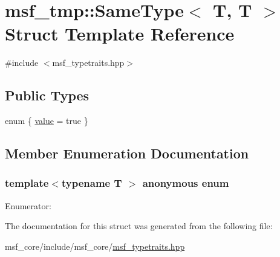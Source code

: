 \hypertarget{structmsf__tmp_1_1SameType_3_01T_00_01T_01_4}{\section{msf\-\_\-tmp\-:\-:Same\-Type$<$ T, T $>$ Struct Template Reference}
\label{structmsf__tmp_1_1SameType_3_01T_00_01T_01_4}
}


{\ttfamily \#include $<$msf\-\_\-typetraits.\-hpp$>$}

\subsection*{Public Types}
\begin{DoxyCompactItemize}
\item 
enum \{ \hyperlink{structmsf__tmp_1_1SameType_3_01T_00_01T_01_4_ab36f6d9cba4d017579bfa077f9da4af9abc93199e5ca0d6e8567efe4050791a00}{value} =  true
 \}
\end{DoxyCompactItemize}


\subsection{Member Enumeration Documentation}
\hypertarget{structmsf__tmp_1_1SameType_3_01T_00_01T_01_4_ab36f6d9cba4d017579bfa077f9da4af9}{\subsubsection[{anonymous enum}]{\setlength{\rightskip}{0pt plus 5cm}template$<$typename T $>$ anonymous enum}}\label{structmsf__tmp_1_1SameType_3_01T_00_01T_01_4_ab36f6d9cba4d017579bfa077f9da4af9}
\begin{Desc}
\item[Enumerator\-: ]\par
\begin{description}
\item[{\em 
\hypertarget{structmsf__tmp_1_1SameType_3_01T_00_01T_01_4_ab36f6d9cba4d017579bfa077f9da4af9abc93199e5ca0d6e8567efe4050791a00}{value}\label{structmsf__tmp_1_1SameType_3_01T_00_01T_01_4_ab36f6d9cba4d017579bfa077f9da4af9abc93199e5ca0d6e8567efe4050791a00}
}]\end{description}
\end{Desc}



The documentation for this struct was generated from the following file\-:\begin{DoxyCompactItemize}
\item 
msf\-\_\-core/include/msf\-\_\-core/\hyperlink{msf__typetraits_8hpp}{msf\-\_\-typetraits.\-hpp}\end{DoxyCompactItemize}
